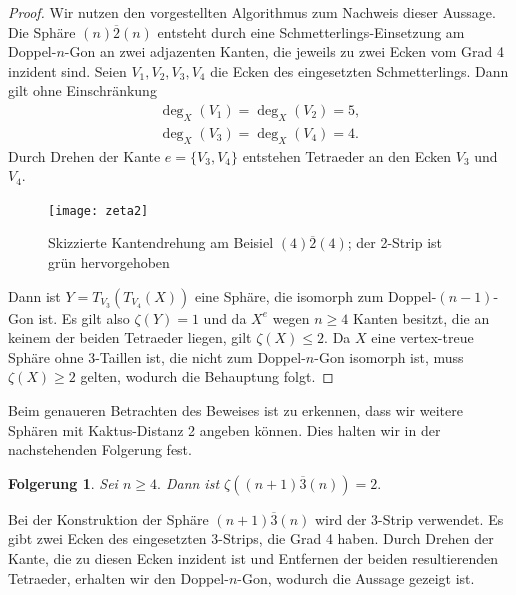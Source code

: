 \documentclass[12pt,titlepage,twoside,cleardoublepage]{article}
\theoremstyle{nummermitklammern}
\newtheorem{folgerung}[temp]{Folgerung}
\newtheorem{folgerung}[zahl]{Folgerung}
\numberwithin{equation}{section}
\begin{document}
\begin{proof}
Wir nutzen den vorgestellten Algorithmus zum Nachweis dieser Aussage.
Die Sphäre $(n)\overline{2}(n)$ entsteht durch eine Schmetterlings-Einsetzung am Doppel-$n$-Gon an zwei adjazenten Kanten, die jeweils zu zwei Ecken vom Grad 4 inzident sind. Seien $V_1,V_2,V_3,V_4$ die Ecken des eingesetzten Schmetterlings. Dann gilt ohne Einschränkung 
\begin{align*}
\deg_X(V_1)=\deg_X(V_2)=5,\\
\deg_X(V_3)=\deg_X(V_4)=4.
\end{align*}
Durch Drehen der Kante $e=\{V_3,V_4\}$ entstehen Tetraeder an den Ecken $V_3$ und $V_4.$ 
  
\begin{figure}[H]
\begin{center}
\texttt{[image: zeta2]}
\end{center}
\caption{Skizzierte Kantendrehung am Beisiel $(4)\overline{2}(4)$; der 2-Strip ist grün hervorgehoben}
\end{figure}
Dann ist $Y=T_{V_3}(T_{V_4}(X))$ eine Sphäre, die isomorph zum Doppel-$(n-1)$-Gon ist. Es gilt also $\zeta (Y)=1$ und da $X^e$ wegen $n\geq 4$ Kanten besitzt, die an keinem der beiden Tetraeder liegen, gilt $\zeta (X)\leq 2.$ Da $X$ eine vertex-treue Sphäre ohne 3-Taillen ist, die nicht zum Doppel-$n$-Gon isomorph ist, muss $\zeta(X)\geq 2$ gelten, wodurch die Behauptung folgt. 
\end{proof}
Beim genaueren Betrachten des Beweises ist zu erkennen, dass wir weitere Sphären mit Kaktus-Distanz 2 angeben können.
Dies halten wir in der nachstehenden Folgerung fest.
\begin{folgerung}
Sei $n\geq 4.$ Dann ist $\zeta ((n+1)\overline{3}(n))=2.$
\end{folgerung}
Bei der Konstruktion der Sphäre $(n+1)\overline{3}(n)$ wird der 3-Strip verwendet. Es gibt zwei Ecken des eingesetzten 3-Strips, die Grad 4 haben. Durch Drehen der Kante, die zu diesen Ecken inzident ist und Entfernen der beiden resultierenden Tetraeder, erhalten wir den Doppel-$n$-Gon, wodurch die Aussage gezeigt ist.
\end{document}
